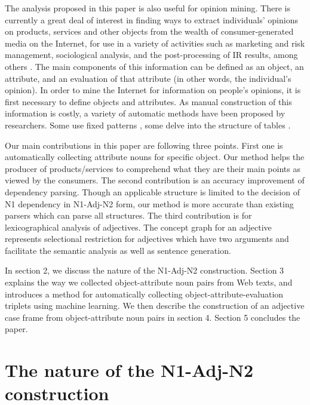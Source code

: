 \documentclass[english]{jnlp_1.4}
\begin{document}
The analysis proposed in this paper is also useful for opinion mining.
There is currently a great deal of interest in finding ways to extract
individuals' opinions on products, services and other objects from the
wealth of consumer-generated media on the Internet, for use in a variety
of activities such as marketing and risk management, sociological
analysis, and the post-processing of IR results, among others
\cite{suzuki:2006,kobayashi:2007}. The main
components of this information can be defined as an object, an
attribute, and an evaluation of that attribute (in other words, the
individual's opinion). In order to mine the Internet for information on
people's opinions, it is first necessary to define objects and
attributes. As manual construction of this information is costly, a
variety of automatic methods have been proposed by researchers. Some use
fixed patterns \cite{matthew:1999,abdulrahman:2004}, some delve into the
structure of tables \cite{yoshida:2004}.

Our main contributions in this paper are following three points. First
one is automatically collecting attribute nouns for specific
object. Our method helps the producer of products/services to
comprehend what they are their main points as viewed by the
consumers. The second contribution is an accuracy improvement of
dependency parsing. Though an applicable structure is limited to the
decision of N1 dependency in N1-Adj-N2 form, our method is more
accurate than existing parsers which can parse all structures.  The
third contribution is for lexicographical analysis of adjectives.  The
concept graph for an adjective represents selectional restriction for
adjectives which have two arguments and facilitate the semantic
analysis as well as sentence generation.


In section 2, we discuss the nature of the N1-Adj-N2
construction. Section 3 explains the way we collected object-attribute
noun pairs from Web texts, and introduces a method for automatically
collecting object-attribute-evaluation triplets using machine
learning. We then describe the construction of an adjective case frame
from object-attribute noun pairs in section 4. Section 5 concludes the
paper.


\section{The nature of the N1-Adj-N2 construction}
\end{document}

